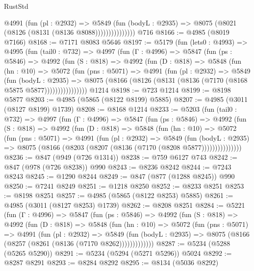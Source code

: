 \begin{lexlean}{RustStd}
\begin{coremodule}
                    @4991
                      (fun (pl : @2932) =>
                      @5849
                        (fun (bodyL : @2935) =>
                        @8075 (@8021 (@8126 (@8131 (@8136 @8088)))))))))))))))
    @716
@8166 := @4985 (@8019 @7166)
@8168 := @7171 @8083 @5646
@8197 := @5179
    (fun (lets0 : @4993) =>
    @4995
      (fun (tail0 : @732) =>
      @4997
        (fun (Γ : @4996) =>
        @5847
          (fun (ps : @5846) =>
          @4992
            (fun (S : @818) =>
            @4992
              (fun (D : @818) =>
              @5848
                (fun (hn : @10) =>
                @5072
                  (fun (pns : @5071) =>
                  @4991
                    (fun (pl : @2932) =>
                    @5849
                      (fun (bodyL : @2935) =>
                      @8075 (@8166 (@8126 (@8131 (@8136 (@7170 (@8168 @5875 @5877))))))))))))))))
    @1214
@8198 := @723 @1214
@8199 := @8198 @5877
@8203 := @4985 (@5865 (@8122 @8199) @5885)
@8207 := @4985 (@3011 (@8127 @8199) @1739)
@8208 := @8168 @1214
@8233 := @5203
    (fun (tail0 : @732) =>
    @4997
      (fun (Γ : @4996) =>
      @5847
        (fun (ps : @5846) =>
        @4992
          (fun (S : @818) =>
          @4992
            (fun (D : @818) =>
            @5848
              (fun (hn : @10) =>
              @5072
                (fun (pns : @5071) =>
                @4991
                  (fun (pl : @2932) =>
                  @5849
                    (fun (bodyL : @2935) =>
                    @8075 (@8166 (@8203 (@8207 (@8136 (@7170 (@8208 @5877)))))))))))))))
@8236 := @847 (@949 (@726 @1314))
@8238 := @759 @6127 @743
@8242 := @847 (@978 (@726 @8238)) @990
@8243 := @8236 @8242
@8244 := @7243 @8243
@8245 := @1290 @8244
@8249 := @847 (@877 (@1288 @8245)) @990
@8250 := @7241 @8249
@8251 := @1218 @8250
@8252 := @8233 @8251
@8253 := @8198 @8251
@8257 := @4985 (@5865 (@8122 @8253) @5885)
@8261 := @4985 (@3011 (@8127 @8253) @1739)
@8262 := @8208 @8251
@8284 := @5221
    (fun (Γ : @4996) =>
    @5847
      (fun (ps : @5846) =>
      @4992
        (fun (S : @818) =>
        @4992
          (fun (D : @818) =>
          @5848
            (fun (hn : @10) =>
            @5072
              (fun (pns : @5071) =>
              @4991
                (fun (pl : @2932) =>
                @5849
                  (fun (bodyL : @2935) =>
                  @8075 (@8166 (@8257 (@8261 (@8136 (@7170 @8262)))))))))))))
@8287 := @5234 (@5288 (@5265 @5290))
@8291 := @5234 (@5294 (@5271 @5296)) @5024
@8292 := @8287 @8291
@8293 := @8284 @8292
@8295 := @8134 (@5036 @8292)

\end{coremodule}
\end{lexlean}
